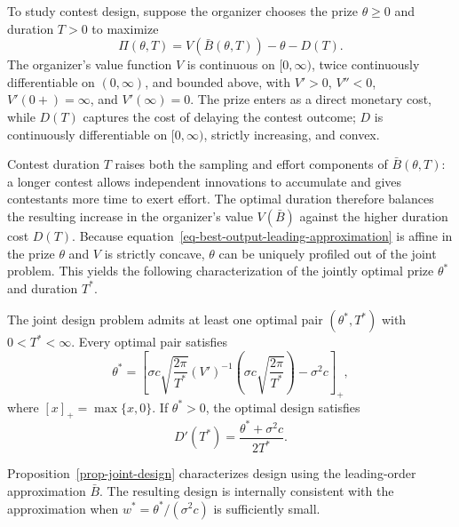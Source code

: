 \documentclass[mnsc]{informs3}
\begin{document}
To study contest design, suppose the organizer chooses the prize $\theta\geq0$ and duration $T>0$ to maximize
\begin{equation}\label{eq-designer-best-output-objective}
\Pi(\theta,T)
=V\!\left(\bar B(\theta,T)\right)-\theta-D(T).
\end{equation}
The organizer's value function $V$ is continuous on $[0,\infty)$, twice continuously differentiable on $(0,\infty)$, and bounded above, with $V'>0$, $V''<0$, $V'(0+)=\infty$, and $V'(\infty)=0$.
The prize enters as a direct monetary cost, while $D(T)$ captures the cost of delaying the contest outcome; $D$ is continuously differentiable on $[0,\infty)$, strictly increasing, and convex.

Contest duration $T$ raises both the sampling and effort components of $\bar B(\theta,T)$: a longer contest allows independent innovations to accumulate and gives contestants more time to exert effort.
The optimal duration therefore balances the resulting increase in the organizer's value $V(\bar B)$ against the higher duration cost $D(T)$.
Because equation~\eqref{eq-best-output-leading-approximation} is affine in the prize $\theta$ and $V$ is strictly concave, $\theta$ can be uniquely profiled out of the joint problem.
This yields the following characterization of the jointly optimal prize $\theta^*$ and duration $T^*$.

\begin{proposition}\label{prop-joint-design}
The joint design problem admits at least one optimal pair $(\theta^*,T^*)$ with $0<T^*<\infty$.
Every optimal pair satisfies
\begin{equation}\label{eq-optimal-prize}
\theta^*
=\left[
\sigma c\sqrt{\frac{2\pi}{T^*}}
(V')^{-1}\!\left(\sigma c\sqrt{\frac{2\pi}{T^*}}\right)
-\sigma^2c
\right]_+,
\end{equation}
where $[x]_+=\max\{x,0\}$.
If $\theta^*>0$, the optimal design satisfies
\begin{equation}\label{eq-optimal-duration-condition}
D'(T^*)
=\frac{\theta^*+\sigma^2c}{2T^*}.
\end{equation}
\end{proposition}

\begin{remark}
Proposition~\ref{prop-joint-design} characterizes design using the leading-order approximation $\bar B$.
The resulting design is internally consistent with the approximation when $w^*=\theta^*/(\sigma^2c)$ is sufficiently small.
\end{remark}
\end{document}
